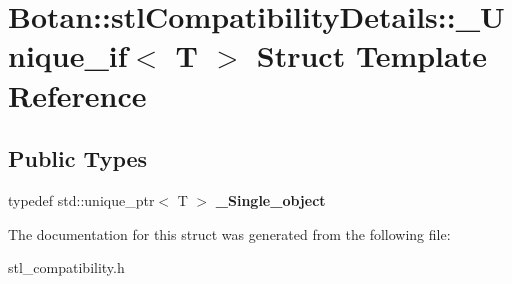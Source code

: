 \hypertarget{struct_botan_1_1stl_compatibility_details_1_1___unique__if}{}\section{Botan\+:\+:stl\+Compatibility\+Details\+:\+:\+\_\+\+Unique\+\_\+if$<$ T $>$ Struct Template Reference}
\label{struct_botan_1_1stl_compatibility_details_1_1___unique__if}
\subsection*{Public Types}
\begin{DoxyCompactItemize}
\item 
\mbox{\label{struct_botan_1_1stl_compatibility_details_1_1___unique__if_a120403bf785feec27820c1f50e6e7b21}} 
typedef std\+::unique\+\_\+ptr$<$ T $>$ {\bfseries \+\_\+\+Single\+\_\+object}
\end{DoxyCompactItemize}


The documentation for this struct was generated from the following file\+:\begin{DoxyCompactItemize}
\item 
stl\+\_\+compatibility.\+h\end{DoxyCompactItemize}
